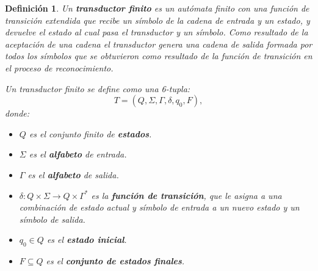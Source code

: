 \documentclass[12pt]{article}
\newtheorem{definition}{Definición}
\begin{document}
\begin{definition}
  Un \textbf{transductor finito} es un autómata finito con una función de transición extendida que recibe un símbolo de la cadena de entrada y un estado, y devuelve el estado al cual pasa el transductor y un símbolo.  Como resultado de la aceptación de una cadena el transductor genera una cadena de salida formada por todos los símbolos que se obtuvieron como resultado de la función de transición en el proceso de reconocimiento.
  
  Un transductor finito se define como una 6-tupla:
  \[
    T = (Q, \Sigma, \Gamma, \delta, q_0, F),
  \]
  donde:
  \begin{itemize}
    \item \(Q\) es el conjunto finito de \textbf{estados}.
    \item \(\Sigma\) es el \textbf{alfabeto} de entrada.
    \item \(\Gamma\) es el \textbf{alfabeto} de salida.
    \item \(\delta: Q \times \Sigma \to Q \times \Gamma^*\) es la \textbf{función de transición}, que le asigna a una combinación de estado actual y símbolo de entrada a un nuevo estado y un símbolo de salida.
    \item \(q_0 \in Q\) es el \textbf{estado inicial}.
    \item \(F \subseteq Q\) es el \textbf{conjunto de estados finales}.
  \end{itemize}
\end{definition}
\end{document}
